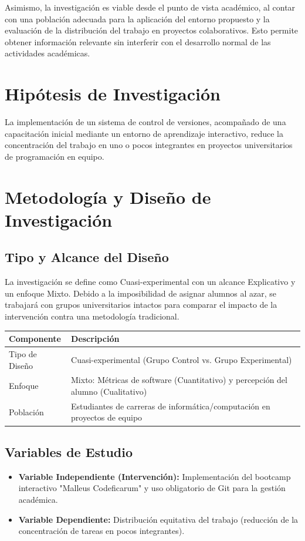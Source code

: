 \documentclass[12pt,a4paper]{article}
\begin{document}
Asimismo, la investigación es viable desde el punto de vista académico, al contar con una población adecuada para la aplicación del entorno propuesto y la evaluación de la distribución del trabajo en proyectos colaborativos. Esto permite obtener información relevante sin interferir con el desarrollo normal de las actividades académicas.

\section{Hipótesis de Investigación}
La implementación de un sistema de control de versiones, acompañado de una capacitación inicial mediante un entorno de aprendizaje interactivo, reduce la concentración del trabajo en uno o pocos integrantes en proyectos universitarios de programación en equipo.

\section{Metodología y Diseño de Investigación}

\subsection{Tipo y Alcance del Diseño}
 La investigación se define como Cuasi-experimental con un alcance Explicativo y un enfoque Mixto. Debido a la imposibilidad de asignar alumnos al azar, se trabajará con grupos universitarios intactos para comparar el impacto de la intervención contra una metodología tradicional.
 
 \begin{table}[h]
 \centering
 \begin{tabular}{|l|l|}
 \hline
 Componente & Descripción \\
 \hline
 Tipo de Diseño & Cuasi-experimental (Grupo Control vs. Grupo Experimental) \\
 \hline
 Enfoque & Mixto: Métricas de software (Cuantitativo) y percepción del alumno (Cualitativo) \\
 \hline
 Población & Estudiantes de carreras de informática/computación en proyectos de equipo \\
 \hline
 \end{tabular}
 \end{table}
 
 \subsection{Variables de Estudio}
 \begin{itemize}
     \item \textbf{Variable Independiente (Intervención):} Implementación del bootcamp interactivo "Malleus Codeficarum" y uso obligatorio de Git para la gestión académica.
     \item \textbf{Variable Dependiente:} Distribución equitativa del trabajo (reducción de la concentración de tareas en pocos integrantes).
 \end{itemize}
 
\end{document}
